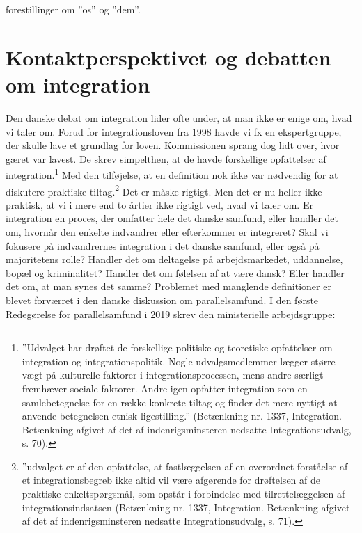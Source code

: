 \documentclass[
]{book}
\begin{document}
forestillinger om ''os'' og ''dem''.

\section{Kontaktperspektivet og debatten om integration}\label{kontaktperspektivet-og-debatten-om-integration}

Den danske debat om integration lider ofte under, at man ikke er enige om, hvad vi taler om. Forud for integrationsloven fra 1998 havde vi fx en ekspertgruppe, der skulle lave et grundlag for loven. Kommissionen sprang dog lidt over, hvor gæret var lavest. De skrev simpelthen, at de havde forskellige opfattelser af integration.\footnote{''Udvalget har drøftet de forskellige politiske og teoretiske opfattelser om integration og integrationspolitik. Nogle udvalgsmedlemmer lægger større vægt på kulturelle faktorer i integrationsprocessen, mens andre særligt fremhæver sociale faktorer. Andre igen opfatter integration som en samlebetegnelse for en række konkrete tiltag og finder det mere nyttigt at anvende betegnelsen etnisk ligestilling.'' (Betænkning nr. 1337, Integration. Betænkning afgivet af det af indenrigsminsteren nedsatte Integrationsudvalg, s. 70).} Med den tilføjelse, at en definition nok ikke var nødvendig for at diskutere praktiske tiltag.\footnote{''udvalget er af den opfattelse, at fastlæggelsen af en overordnet forståelse af et integrationsbegreb ikke altid vil være afgørende for drøftelsen af de praktiske enkeltspørgsmål, som opstår i forbindelse med tilrettelæggelsen af integrationsindsatsen (Betænkning nr. 1337, Integration. Betænkning afgivet af det af indenrigsminsteren nedsatte Integrationsudvalg, s. 71).} Det er måske rigtigt. Men det er nu heller ikke praktisk, at vi i mere end to årtier ikke rigtigt ved, hvad vi taler om. Er integration en proces, der omfatter hele det danske samfund, eller handler det om, hvornår den enkelte indvandrer eller efterkommer er integreret? Skal vi fokusere på indvandrernes integration i det danske samfund, eller også på majoritetens rolle? Handler det om deltagelse på arbejdsmarkedet, uddannelse, bopæl og kriminalitet? Handler det om følelsen af at være dansk? Eller handler det om, at man synes det samme?
Problemet med manglende definitioner er blevet forværret i den danske diskussion om parallelsamfund. I den første \href{https://www.sm.dk/Media/638089426274841934/redegoerelse-om-parallelsamfund_web_final-a.pdf}{Redegørelse for parallelsamfund} i 2019 skrev den ministerielle arbejdsgruppe:
\end{document}
